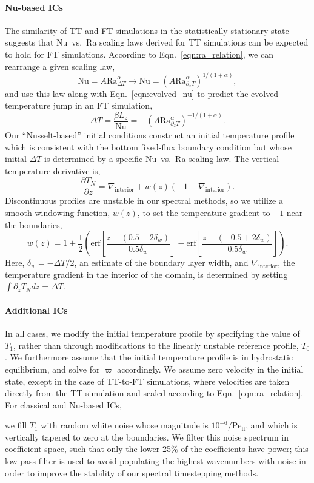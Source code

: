 \documentclass[aps, pre, onecolumn, nofootinbib, notitlepage, groupedaddress, amsfonts, amssymb, amsmath, longbibliography, superscriptaddress]{revtex4-1}
\newcommand{\grad}{\ensuremath{\nabla}}
\newcommand{\Peff}{\ensuremath{\text{Pe}_{\text{ff}}}}
\newcommand{\ea}[1]{{\color{red} #1}}
\begin{document}
\ea{
\paragraph{Nu-based ICs} 
The similarity of TT and FT simulations in the statistically stationary state suggests that Nu~vs.~Ra scaling laws derived for TT simulations can be expected to hold for FT simulations.
According to Eqn.~\ref{eqn:ra_relation}, we can rearrange a given scaling law,
\begin{equation}
\text{Nu} = A \text{Ra}_{\Delta T}^{\alpha} \rightarrow \text{Nu} = (A \text{Ra}_{\partial_z T}^{\alpha})^{1/(1+\alpha)},
\end{equation}
and use this law along with Eqn.~\ref{eqn:evolved_nu} to predict the evolved temperature jump in an FT simulation,
\begin{equation}
\Delta T = \frac{\beta L_z}{\text{Nu}} = -(A \text{Ra}_{\partial_z T}^{\alpha})^{-1/(1+\alpha)}.
\end{equation}
Our ``Nusselt-based'' initial conditions construct an initial temperature profile which is consistent with the bottom fixed-flux boundary condition but whose initial $\Delta T$ is determined by a specific Nu~vs.~Ra scaling law.
The vertical temperature derivative is,
\begin{equation}
\frac{\partial T_N}{\partial z} = \grad_{\text{interior}} + w(z)(-1 - \grad_{\text{interior}}).
\label{eqn:nu_based_gradT}
\end{equation}
Discontinuous profiles are unstable in our spectral methods, so we utilize a smooth windowing function, $w(z)$, to set the temperature gradient to $-1$ near the boundaries,
$$
w(z) = 1 + \frac{1}{2}\left(\text{erf}\left[\frac{z - (0.5 - 2\delta_w)}{0.5\delta_w}\right] - \text{erf}\left[\frac{z - (-0.5 + 2\delta_w)}{0.5\delta_w}\right]\right).
$$
Here, $\delta_w = -\Delta T / 2$, an estimate of the boundary layer width, and $\grad_{\text{interior}}$, the temperature gradient in the interior of the domain, is determined by setting $\int \partial_z T_N dz = \Delta T$.



\paragraph{Additional ICs}
In all cases, we modify the initial temperature profile by specifying the value of $T_1$, rather than through modifications to the linearly unstable reference profile, $T_0$.
We furthermore assume that the initial temperature profile is in hydrostatic equilibrium, and solve for $\varpi$ accordingly.
We assume zero velocity in the initial state, except in the case of TT-to-FT simulations, where velocities are taken directly from the TT simulation and scaled according to Eqn.~\ref{eqn:ra_relation}.
For classical and Nu-based ICs,
}
we fill $T_1$ with random white noise whose magnitude is $10^{-6}/\Peff$, and which is vertically tapered to zero at the boundaries.
We filter this noise spectrum in coefficient space, such that only the lower 25\% of the coefficients have power; this low-pass filter is used to avoid populating the highest wavenumbers with noise in order to improve the stability of our spectral timestepping methods.
\end{document}
